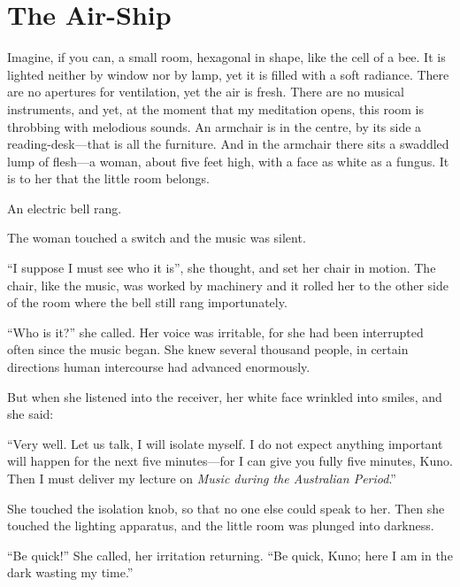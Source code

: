 


\section{The Air-Ship}

Imagine, if you can, a small room, hexagonal in shape, like the cell of a bee. It is lighted neither by window nor by lamp, yet it is filled with a soft radiance. There are no apertures for ventilation, yet the air is fresh. There are no musical instruments, and yet, at the moment that my meditation opens, this room is throbbing with melodious sounds. An armchair is in the centre, by its side a reading-desk---that is all the furniture. And in the armchair there sits a swaddled lump of flesh---a woman, about five feet high, with a face as white as a fungus. It is to her that the little room belongs.

An electric bell rang.

The woman touched a switch and the music was silent.

``I suppose I must see who it is'', she thought, and set her chair in motion. The chair, like the music, was worked by machinery and it rolled her to the other side of the room where the bell still rang importunately.

``Who is it?'' she called. Her voice was irritable, for she had been interrupted often since the music began. She knew several thousand people, in certain directions human intercourse had advanced enormously.

But when she listened into the receiver, her white face wrinkled into smiles, and she said:

``Very well. Let us talk, I will isolate myself. I do not expect anything important will happen for the next five minutes---for I can give you fully five minutes, Kuno. Then I must deliver my lecture on \emph{Music during the Australian Period}.''

She touched the isolation knob, so that no one else could speak to her. Then she touched the lighting apparatus, and the little room was plunged into darkness.

``Be quick!'' She called, her irritation returning. ``Be quick, Kuno; here I am in the dark wasting my time.''

